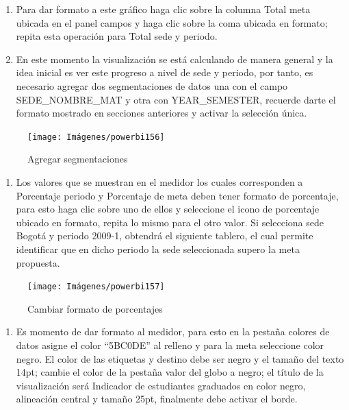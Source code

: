 \documentclass[
]{book}
\providecommand{\tightlist}{%
  \setlength{\itemsep}{0pt}\setlength{\parskip}{0pt}}
\begin{document}
\begin{enumerate}
\def\labelenumi{\arabic{enumi}.}
\setcounter{enumi}{3}
\item
  Para dar formato a este gráfico haga clic sobre la columna Total meta ubicada en el panel campos y haga clic sobre la coma ubicada en formato; repita esta operación para Total sede y periodo.
\item
  En este momento la visualización se está calculando de manera general y la idea inicial es ver este progreso a nivel de sede y periodo, por tanto, es necesario agregar dos segmentaciones de datos una con el campo SEDE\_NOMBRE\_MAT y otra con YEAR\_SEMESTER, recuerde darte el formato mostrado en secciones anteriores y activar la selección única.
\end{enumerate}

\begin{figure}

{\centering \texttt{[image: Imágenes/powerbi156]} 

}

\caption{Agregar segmentaciones}\label{fig:paso5medidor-fig}
\end{figure}

\begin{enumerate}
\def\labelenumi{\arabic{enumi}.}
\setcounter{enumi}{5}
\tightlist
\item
  Los valores que se muestran en el medidor los cuales corresponden a Porcentaje periodo y Porcentaje de meta deben tener formato de porcentaje, para esto haga clic sobre uno de ellos y seleccione el icono de porcentaje ubicado en formato, repita lo mismo para el otro valor. Si selecciona sede Bogotá y periodo 2009-1, obtendrá el siguiente tablero, el cual permite identificar que en dicho periodo la sede seleccionada supero la meta propuesta.
\end{enumerate}

\begin{figure}

{\centering \texttt{[image: Imágenes/powerbi157]} 

}

\caption{Cambiar formato de porcentajes}\label{fig:paso6medidor-fig}
\end{figure}

\begin{enumerate}
\def\labelenumi{\arabic{enumi}.}
\setcounter{enumi}{6}
\tightlist
\item
  Es momento de dar formato al medidor, para esto en la pestaña colores de datos asigne el color ``5BC0DE'' al relleno y para la meta seleccione color negro. El color de las etiquetas y destino debe ser negro y el tamaño del texto 14pt; cambie el color de la pestaña valor del globo a negro; el título de la visualización será Indicador de estudiantes graduados en color negro, alineación central y tamaño 25pt, finalmente debe activar el borde.
\end{enumerate}
\end{document}
